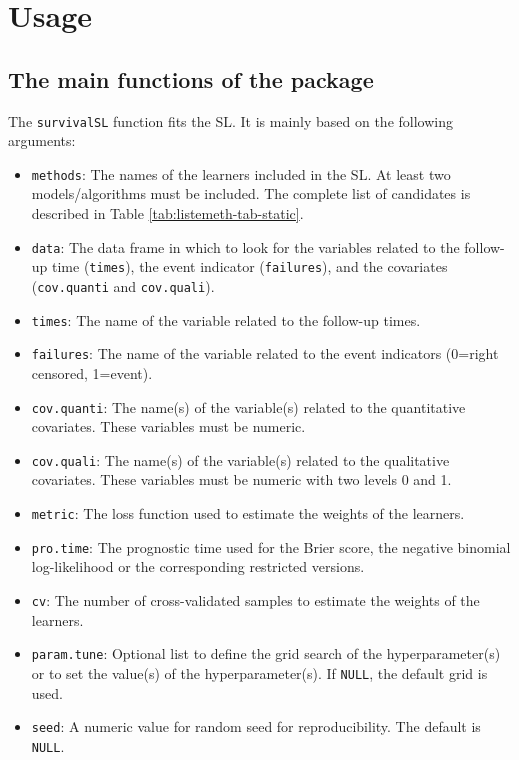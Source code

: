 \hypertarget{usage}{%
\section{Usage}\label{usage}}

\hypertarget{the-main-functions-of-the-package}{%
\subsection{The main functions of the package}\label{the-main-functions-of-the-package}}

The \texttt{survivalSL} function fits the SL. It is mainly based on the following arguments:

\begin{itemize}
\item
  \texttt{methods}: The names of the learners included in the SL. At least two models/algorithms must be included. The complete list of candidates is described in Table \ref{tab:listemeth-tab-static}.
\item
  \texttt{data}: The data frame in which to look for the variables related to the follow-up time (\texttt{times}), the event indicator (\texttt{failures}), and the covariates (\texttt{cov.quanti} and \texttt{cov.quali}).
\item
  \texttt{times}: The name of the variable related to the follow-up times.
\item
  \texttt{failures}: The name of the variable related to the event indicators (0=right censored, 1=event).
\item
  \texttt{cov.quanti}: The name(s) of the variable(s) related to the quantitative covariates. These variables must be numeric.
\item
  \texttt{cov.quali}: The name(s) of the variable(s) related to the qualitative covariates. These variables must be numeric with two levels 0 and 1.
\item
  \texttt{metric}: The loss function used to estimate the weights of the learners.
\item
  \texttt{pro.time}: The prognostic time used for the Brier score, the negative binomial log-likelihood or the corresponding restricted versions.
\item
  \texttt{cv}: The number of cross-validated samples to estimate the weights of the learners.
\item
  \texttt{param.tune}: Optional list to define the grid search of the hyperparameter(s) or to set the value(s) of the hyperparameter(s). If \texttt{NULL}, the default grid is used.
\item
  \texttt{seed}: A numeric value for random seed for reproducibility. The default is \texttt{NULL}.
\end{itemize}


